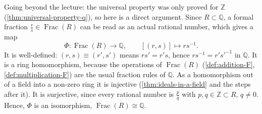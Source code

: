 \begin{content}
\begin{center}
\end{center}

\begin{steps}
Going beyond the lecture: the universal property was only proved for $\mathbb{Z}$ (\cref{thm:universal-property-q}), so here is a direct argument. Since $R \subset \mathbb{Q}$, a formal fraction $\frac{r}{s} \in \operatorname{Frac}(R)$ can be read as an actual rational number, which gives a map
\[
\Phi \colon \operatorname{Frac}(R) \to \mathbb{Q}, \qquad [(r, s)] \mapsto r s^{-1}.
\]
It is well-defined: $(r, s) \equiv (r', s')$ means $r s' = r' s$, hence $r s^{-1} = r' s'^{-1}$ in $\mathbb{Q}$. It is a ring homomorphism, because the operations of $\operatorname{Frac}(R)$ (\cref{def:addition-F}, \cref{def:multiplication-F}) are the usual fraction rules of $\mathbb{Q}$. As a homomorphism out of a field into a non-zero ring it is injective (\cref{thm:ideals-in-a-field} and the steps after it). It is surjective, since every rational number is $\frac{p}{q}$ with $p, q \in \mathbb{Z} \subset R$, $q \neq 0$. Hence, $\Phi$ is an isomorphism, $\operatorname{Frac}(R) \cong \mathbb{Q}$.
\end{steps}
\end{content}

